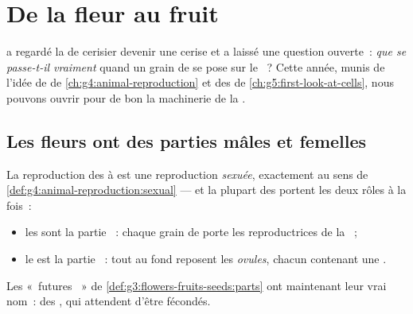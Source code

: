 \chapter{De la fleur au fruit}\label{ch:g5:flower-to-fruit}

 a regardé la  de cerisier
devenir une cerise et a laissé une question ouverte~: \emph{que se
passe-t-il vraiment} quand un grain de  se pose sur le
~? Cette année, munis de l'idée de  de
\cref{ch:g4:animal-reproduction} et des  de
\cref{ch:g5:first-look-at-cells}, nous pouvons ouvrir pour de bon la
machinerie de la .

\section{Les fleurs ont des parties mâles et femelles}

\begin{proposition}\label{prop:g5:flower-to-fruit:roles}
La reproduction des  à  est une reproduction
\emph{sexuée}, exactement au sens de
\cref{def:g4:animal-reproduction:sexual} --- et la plupart des
 portent les deux rôles à la fois~:
\begin{itemize}
  \item les \emph{} sont la partie ~: chaque grain de
        \emph{} porte les  reproductrices  de la
        ~;
  \item le \emph{} est la partie ~: tout au fond
        reposent les \emph{ovules}, chacun contenant
        une .
\end{itemize}
Les «~futures ~» de
\cref{def:g3:flowers-fruits-seeds:parts} ont maintenant leur vrai
nom~: des , qui attendent d'être fécondés.
\end{proposition}
\admitted

